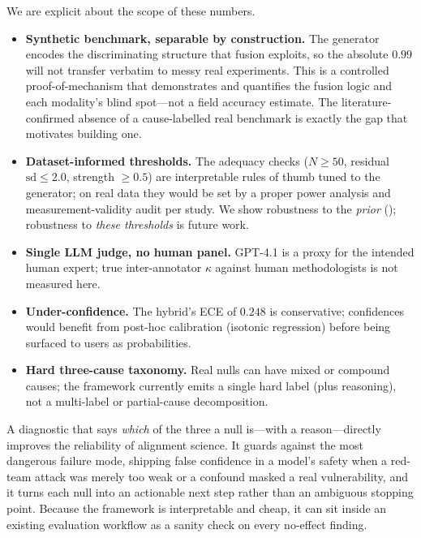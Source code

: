  We are explicit about the scope of these numbers.
\begin{itemize}[leftmargin=*,itemsep=1pt,topsep=1pt]
  \item \textbf{Synthetic benchmark, separable by construction.} The generator
        encodes the discriminating structure that fusion exploits, so the absolute
        $0.99$ will not transfer verbatim to messy real experiments. This is a
        controlled proof-of-mechanism that demonstrates and quantifies the fusion
        logic and each modality's blind spot---not a field accuracy estimate. The
        literature-confirmed absence of a cause-labelled real benchmark is exactly
        the gap that motivates building one.
  \item \textbf{Dataset-informed thresholds.} The adequacy checks
        ($N \ge 50$, residual $\mathrm{sd} \le 2.0$, strength $\ge 0.5$) are
        interpretable rules of thumb tuned to the generator; on real data they
        would be set by a proper power analysis and measurement-validity audit per
        study. We show robustness to the \emph{prior} ();
        robustness to \emph{these thresholds} is future work.
  \item \textbf{Single LLM judge, no human panel.} GPT-4.1 is a proxy for the
        intended human expert; true inter-annotator $\kappa$ against human
        methodologists is not measured here.
  \item \textbf{Under-confidence.} The hybrid's ECE of $0.248$ is conservative;
        confidences would benefit from post-hoc calibration (\eg isotonic
        regression) before being surfaced to users as probabilities.
  \item \textbf{Hard three-cause taxonomy.} Real nulls can have mixed or compound
        causes; the framework currently emits a single hard label (plus reasoning),
        not a multi-label or partial-cause decomposition.
\end{itemize}

 A diagnostic that says \emph{which} of the three a
null is---with a reason---directly improves the reliability of alignment science.
It guards against the most dangerous failure mode, shipping false confidence in a
model's safety when a red-team attack was merely too weak or a confound masked a
real vulnerability, and it turns each null into an actionable next step rather than
an ambiguous stopping point. Because the framework is interpretable and cheap, it
can sit inside an existing evaluation workflow as a sanity check on every
no-effect finding.

